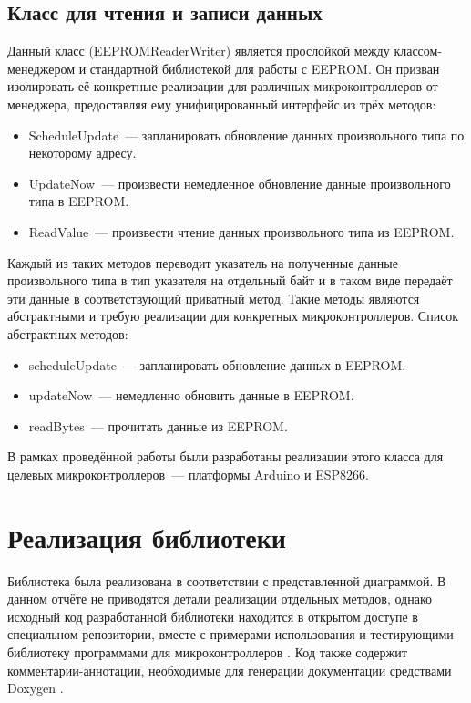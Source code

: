 \subsection{Класс для чтения и записи данных}

Данный класс (EEPROMReaderWriter) является прослойкой между классом-менеджером и стандартной библиотекой для работы с EEPROM.
Он призван изолировать её конкретные реализации для различных микроконтроллеров от менеджера, предоставляя ему унифицированный интерфейс из трёх методов:

\begin{itemize}
	\item ScheduleUpdate~--- запланировать обновление данных произвольного типа по некоторому адресу.
	\item UpdateNow~---	произвести немедленное обновление данные произвольного типа в EEPROM.
	\item ReadValue~--- произвести чтение данных произвольного типа из EEPROM.
\end{itemize}

Каждый из таких методов переводит указатель на полученные данные произвольного типа в тип указателя на отдельный байт и в таком виде передаёт эти данные в соответствующий приватный метод.
Такие методы являются абстрактными и требую реализации для конкретных микроконтроллеров.
Список абстрактных методов:
\begin{itemize}
	\item scheduleUpdate~--- запланировать обновление данных в EEPROM.
	\item updateNow~--- немедленно обновить данные в EEPROM.
	\item readBytes~---	прочитать данные из EEPROM.
\end{itemize}

В рамках проведённой работы были разработаны реализации этого класса для целевых микроконтроллеров~--- платформы Arduino и ESP8266.


\section{Реализация библиотеки}

Библиотека была реализована в соответствии с представленной диаграммой.
В данном отчёте не приводятся детали реализации отдельных методов, однако исходный код разработанной библиотеки находится в открытом доступе в специальном репозитории, вместе с примерами использования и тестирующими библиотеку программами для микроконтроллеров \cite{web:eepromanager}.
Код также содержит комментарии-аннотации, необходимые для генерации документации средствами Doxygen \cite{web:doxygen}.

